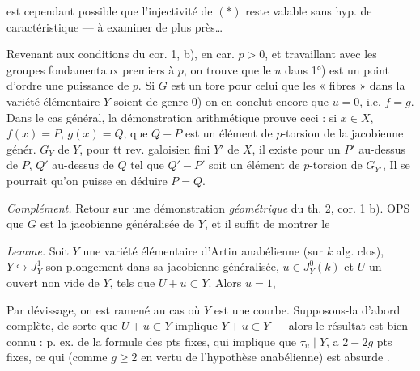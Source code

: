 \documentclass[11pt,a4paper]{article}
\begin{document}
est cependant possible que l'injectivité de $(*)$ reste valable sans hyp. de caractéristique — à examiner de plus près…

Revenant aux conditions du cor. 1, b), en car. $p > 0$, et travaillant avec les groupes fondamentaux premiers à $p$, on trouve que le $u$ dans 1°) est un point  d'ordre une puissance de $p$. Si $G$ est un tore \ill{} pour celui que les « fibres » dans la variété élémentaire $Y$ soient de genre $0$) on en conclut encore que $u = 0$, i.e. $f = g$. Dans le cas général, la démonstration arithmétique prouve  ceci : si $x \in X$,  $f(x) = P$, $g(x) = Q$,  que $Q - P$ est un élément de $p$-torsion de la jacobienne génér. $G_Y$ de $Y$,  \ill{} pour tt rev.  galoisien fini $Y'$ de $X$,  il existe pour un $P'$ au-dessus de $P$,  $Q'$ au-dessus de $Q$ tel que $Q' - P'$ soit un élément de $p$-torsion de $G_{Y'}$, \struck{\ill{}}   Il se pourrait qu'on puisse en déduire $P = Q$.



\emph{Complément.} Retour sur une démonstration \emph{géométrique} du th. 2, cor. 1 b). OPS que $G$ est la jacobienne généralisée de $Y$, et il suffit de montrer le

\emph{Lemme.} Soit $Y$ une variété élémentaire d'Artin anabélienne (sur $k$ alg. clos), $Y \hookrightarrow J^1_Y$ son plongement dans sa jacobienne généralisée, $u \in J^0_Y(k)$ et $U$ un ouvert non vide de $Y$, tels que $U + u \subset Y$. Alors $u = 1$, 

Par dévissage, on est ramené au cas où $Y$ est une courbe. Supposons-la d'abord complète, de sorte que $U + u \subset Y$ implique $Y + u \subset Y$ — alors le résultat est bien connu :  \ill{} p. ex. de la formule des pts fixes, qui implique que  $\tau_u \mid Y$, a $2 - 2g$ pts fixes, ce qui (comme $g \geq 2$ en vertu de l'hypothèse anabélienne) est absurde .
\end{document}
